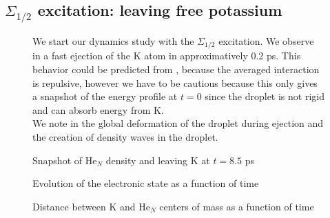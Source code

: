\subsection{$\Sigma_{1/2}$ excitation: leaving free potassium}

\begin{figure}[h!]
	\begin{minipage}[c]{0.48\linewidth}
	\hspace{\oldindent} We start our dynamics study with the $\Sigma_{1/2}$ excitation. 
	We observe in  a fast ejection of the K atom in approximatively 0.2 ps. This behavior could be predicted from , because the averaged interaction is repulsive, however we have to be cautious because this only gives a snapshot of the energy profile at $t=0$ since the droplet is not rigid and can absorb energy from K.\\
	
	 \hspace{\oldindent} We note in  the global deformation of the droplet during ejection and the creation of density waves in the droplet.\\
	\end{minipage}
\hfill
	\begin{minipage}[c]{0.48\linewidth}
		\caption{Snapshot of He$_N$ density and leaving K at $t=8.5$ ps\label{fig:4P-s12-snap}}
	\end{minipage}
\end{figure}

\begin{figure}[h!]
	\centering
	\begin{minipage}[c]{0.48\linewidth}
		
		\vspace{0.2\baselineskip}
		\caption{Evolution of the electronic state as a function of time\label{fig:4P-s12-proj}}
	\end{minipage}
\hfill
	\begin{minipage}[c]{0.48\linewidth}
		
		\vspace{0.2\baselineskip}
		\caption{Distance between K and He$_N$ centers of mass as a function of time\label{fig:4P-s12-pos}}
	\end{minipage}
\end{figure}


